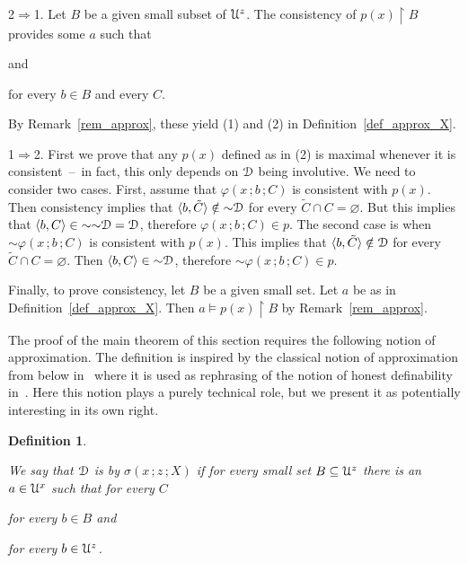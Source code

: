 \documentclass{amsproc}
\makeatletter
\newcounter{thm}
\theoremstyle{mio}
\newtheorem{definition}[thm]{Definition}\tcolorboxenvironment{definition}{mythm}
\providecommand{\proofNameStyle}{\bfseries}
\renewenvironment{proof}[1][\proofname]{\par
  \pushQED{\qed}%
  \normalfont%
  \trivlist
  \item[\hskip\labelsep
        \proofNameStyle
    #1\@addpunct{.}]\ignorespaces
}{%
  \popQED\endtrivlist\@endpefalse
}
\renewcommand*{\emph}[1]{%
   \smash{\tikz[baseline]\node[rectangle, fill=teal!25, rounded corners, inner xsep=0.5ex, inner ysep=0.2ex, anchor=base, minimum height = 2.7ex]{\strut #1};}}
\makeatother
\begin{document}
\begin{proof}
  2$\Rightarrow$1.
  Let $B$ be a given small subset of ${\EuScript U}^z$.
  The consistency of $p(x)\restriction B$ provides some $a$ such that

  \quad and 
  
  \hfill for every $b\in B$ and every $C$. 

  By Remark~\ref{rem_approx}, these yield (1) and (2) in Definition~\ref{def_approx_X}.
  
  1$\Rightarrow$2.
  First we prove that any $p(x)$ defined as in (2) is maximal whenever it is consistent~--~in fact, this only depends on ${\EuScript D}$ being involutive.
  We need to consider two cases.
  First, assume that $\varphi(x\,;b\,;C)$ is consistent with $p(x)$.
  Then consistency implies that $\langle b,\tilde C\rangle\notin{\sim}{\EuScript D}$ for every $\tilde C\cap C=\varnothing$.
  But this implies that $\langle b, C\rangle\in{\sim}{\sim}{\EuScript D}={\EuScript D}$, therefore $\varphi(x\,;b\,;C)\in p$.
  The second case is when ${\sim}\varphi(x\,;b\,;C)$ is consistent with $p(x)$.
  This implies that $\langle b,\tilde C\rangle\notin{\EuScript D}$ for every $\tilde C\cap C=\varnothing$.
  Then $\langle b,C\rangle\in{\sim}{\EuScript D}$, therefore ${\sim}\varphi(x\,;b\,;C)\in p$.

  Finally, to prove consistency, let $B$ be a given small set.
  Let $a$ be as in Definition~\ref{def_approx_X}.
  Then $a\models p(x)\restriction B$ by Remark~\ref{rem_approx}.
\end{proof}

The proof of the main theorem of this section requires the following notion of approximation.
The definition is inspired by the classical notion of approximation from below in~\cite{Z15} where it is used as rephrasing of the notion of honest definability in~\cite{CS}.
Here this notion plays a purely technical role, but we present it as potentially interesting in its own right.

\begin{definition}\label{def_approx_blw}\strut
  We say that ${\EuScript D}$ is \emph{approximable\/} by $\sigma(x\,;z\,;X)$ \emph{from below\/} if for every small set $B\subseteq{\EuScript U}^z$ there is an $a\in{\EuScript U}^x$ such that for every $C$\smallskip

  \hfill for every $b\in B$ and\smallskip

  \hfill for every $b\in{\EuScript U}^z$.\smallskip
\end{definition}
\end{document}
